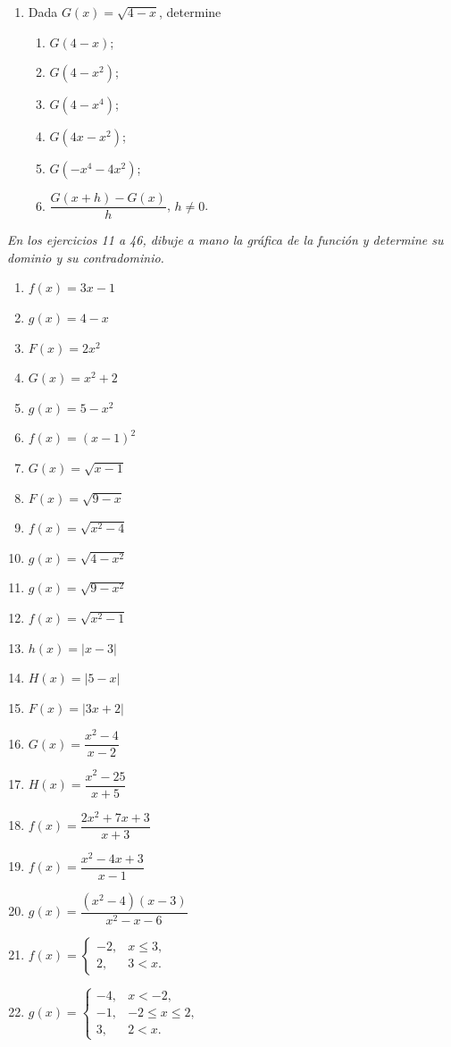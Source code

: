 \documentclass[12pt]{article}
\theoremstyle{remark}
\begin{document}
\begin{enumerate}
\item Dada $G(x)=\sqrt{4-x}$, determine
\begin{enumerate}[label=(\alph*)]
\item $G(4-x)$; \item $G(4-x^2)$; \item $G(4-x^4)$; \item $G(4x-x^2)$;
\item $G(-x^4-4x^2)$; \item $\dfrac{G(x+h)-G(x)}{h}$, $h\ne0$.
\end{enumerate}
\end{enumerate}

\textit{En los ejercicios 11 a 46, dibuje a mano la gráfica de la función y determine su dominio y su contradominio.}

\begin{enumerate}[resume]
\item $f(x)=3x-1$
\item $g(x)=4-x$
\item $F(x)=2x^2$
\item $G(x)=x^2+2$
\item $g(x)=5-x^2$
\item $f(x)=(x-1)^2$
\item $G(x)=\sqrt{x-1}$
\item $F(x)=\sqrt{9-x}$
\item $f(x)=\sqrt{x^2-4}$
\item $g(x)=\sqrt{4-x^2}$
\item $g(x)=\sqrt{9-x^2}$
\item $f(x)=\sqrt{x^2-1}$
\item $h(x)=|x-3|$
\item $H(x)=|5-x|$
\item $F(x)=|3x+2|$
\item $G(x)=\dfrac{x^2-4}{x-2}$
\item $H(x)=\dfrac{x^2-25}{x+5}$
\item $f(x)=\dfrac{2x^2+7x+3}{x+3}$
\item $f(x)=\dfrac{x^2-4x+3}{x-1}$
\item $g(x)=\dfrac{(x^2-4)(x-3)}{x^2-x-6}$
\item $f(x)=\begin{cases}-2,&x\le3,\\2,&3<x.\end{cases}$
\item $g(x)=\begin{cases}-4,&x<-2,\\-1,&-2\le x\le2,\\3,&2<x.\end{cases}$

\end{enumerate}
\end{document}
